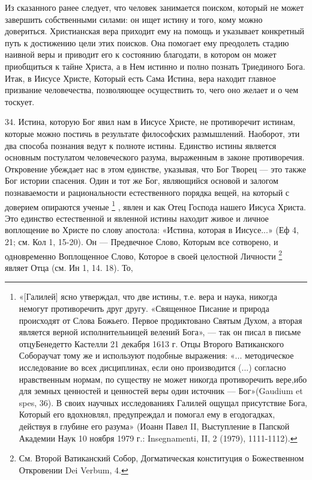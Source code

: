 \documentclass[a5paper,10pt]{article}
\begin{document}
Из сказанного ранее следует, что человек занимается поиском, который не может
завершить собственными силами: он ищет истину и того, кому можно довериться.
Христианская вера приходит ему на помощь и указывает конкретный путь к
достижению цели этих поисков. Она помогает ему преодолеть стадию наивной веры и
приводит его к состоянию благодати, в котором он может приобщиться к тайне
Христа, а в Нем истинно и полно познать Триединого Бога. Итак, в Иисусе Христе,
Который есть Сама Истина, вера находит главное призвание человечества,
позволяющее осуществить то, чего оно желает и о чем тоскует.

34. Истина, которую Бог явил нам в Иисусе Христе, не противоречит истинам,
которые можно постичь в результате философских размышлений. Наоборот, эти два
способа познания ведут к полноте истины. Единство истины является основным
постулатом человеческого разума, выраженным в законе противоречия. Откровение
убеждает нас в этом единстве, указывая, что Бог Творец — это также Бог истории
спасения. Один и тот же Бог, являющийся основой и залогом познаваемости и
рациональности естественного порядка вещей, на который с доверием опираются
ученые \footnote{«[Галилей] ясно утверждал, что две истины, т.е. вера и наука,
    никогда немогут противоречить друг другу. «Священное Писание и природа
    происходят от Слова Божьего. Первое продиктовано Святым Духом, а вторая
    является верной исполнительницей велений Бога», — так он писал в письме
    отцуБенедетто Кастелли 21 декабря 1613 г. Отцы Второго Ватиканского
    Собораучат тому же и используют подобные выражения: «... методическое
    исследование во всех дисциплинах, если оно производится (...) согласно
    нравственным нормам, по существу не может никогда противоречить вере,ибо
    для земных ценностей и ценностей веры один источник — Бог»(Gaudium et spes,
    36). В своих научных исследованиях Галилей ощущал присутствие Бога, Который
    его вдохновлял, предупреждал и помогал ему в егодогадках, действуя в
    глубине его разума» (Иоанн Павел II, Выступление в Папской Академии Наук 10
ноября 1979 г.: Insegnamenti, II, 2 (1979), 1111-1112).}  , явлен и как Отец
Господа нашего Иисуса Христа.  Это единство естественной и явленной истины
находит живое и личное воплощение во Христе по слову апостола: «Истина, которая
в Иисусе...» (Еф 4, 21; см. Кол 1, 15-20). Он — Предвечное Слово, Которым все
сотворено, и одновременно Воплощенное Слово, Которое в своей целостной Личности
\footnote{См. Второй Ватиканский Собор, Догматическая конституция о
Божественном Откровении Dei Verbum, 4.}  являет Отца (см. Ин 1, 14. 18). То,
\end{document}
